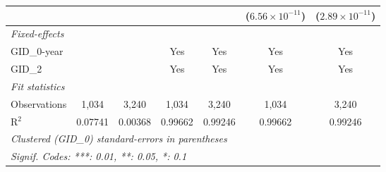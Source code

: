 \begin{table}[htbp]
\begin{tabular}{lcccccc}
                         &               &                      &                         &                         & ($6.56\times 10^{-11}$)  & ($2.89\times 10^{-11}$)\\    
      \midrule
      \emph{Fixed-effects}\\
      GID\_0-year        &               &                      & Yes                     & Yes                     & Yes                      & Yes\\  
      GID\_2             &               &                      & Yes                     & Yes                     & Yes                      & Yes\\  
      \midrule
      \emph{Fit statistics}\\
      Observations       & 1,034         & 3,240                & 1,034                   & 3,240                   & 1,034                    & 3,240\\  
      R$^2$              & 0.07741       & 0.00368              & 0.99662                 & 0.99246                 & 0.99662                  & 0.99246\\  
      \midrule \midrule
      \multicolumn{7}{l}{\emph{Clustered (GID\_0) standard-errors in parentheses}}\\
      \multicolumn{7}{l}{\emph{Signif. Codes: ***: 0.01, **: 0.05, *: 0.1}}\\
   \end{tabular}
\end{table}




